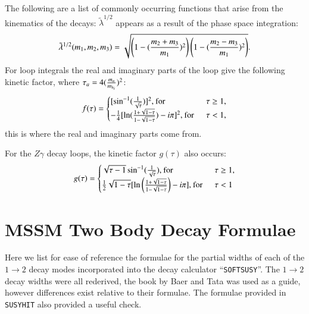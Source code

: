 \documentclass[final,3p,times,pdflatex]{elsarticle}
\begin{document}
The following are a list of commonly occurring functions that arise from the kinematics of the decays:
$\tilde{\lambda}^{1/2}$ appears as a result of the phase space integration:
\begin{equation}
\tilde{\lambda}^{1/2} (m_{1}, m_2, m_{3}) = \sqrt{\left(1- ({m_2 + m_3 \over m_1})^2\right)\left(1-({m_2 - m_3 \over m_1})^2\right)}.
\end{equation}
For loop integrals the real and imaginary parts of the loop give the following kinetic factor, where $\tau_{a} = 4({m_{a} \over m_{h_i}})^2$:
\begin{equation} \label{ftau}
f(\tau) = \begin{cases}
			[\sin^{-1} ({1 \over \sqrt{\tau}})]^2, \: $for$ & \: \: \tau \geq 1, \\
			-{1 \over 4} [\ln({1+\sqrt{1-\tau} \over 1-\sqrt{1-\tau}}) - i \pi]^2, \: $for$ & \: \: \tau < 1, \\
			\end{cases}
\end{equation}
this is where the real and imaginary parts come from.

For the $Z\gamma$ decay loops, the kinetic factor $g(\tau)$ also occurs:
\begin{equation}
g(\tau) = \begin{cases} \label{gtau}
			\sqrt{\tau - 1} \sin^{-1} ({1 \over \sqrt{\tau}}), \: $for$ & \: \: \tau \geq 1, \\
			{1 \over 2}\sqrt{1-\tau} [\ln\left({1+\sqrt{1-\tau} \over 1-\sqrt{1-\tau}}\right) - i \pi], \: $for$ & \: \: \tau < 1 \\
			\end{cases}
\end{equation}


\section{MSSM Two Body Decay Formulae} \label{appendix:MSSM2body}

Here we list for ease of reference the formulae for the partial widths of each of the $1 \rightarrow 2$ decay modes
incorporated into the decay calculator “{\tt {\tt SOFTSUSY}}”. The $1 \rightarrow 2$ decay widths were all rederived, the book by Baer and Tata \cite{TataBaer} was used as a guide, however differences exist relative to their formulae. The formulae provided in {\tt SUSYHIT} \cite{Djouadi:2006bz,Djouadi:1997yw,Djouadi:2005} also provided a useful check.
\end{document}
